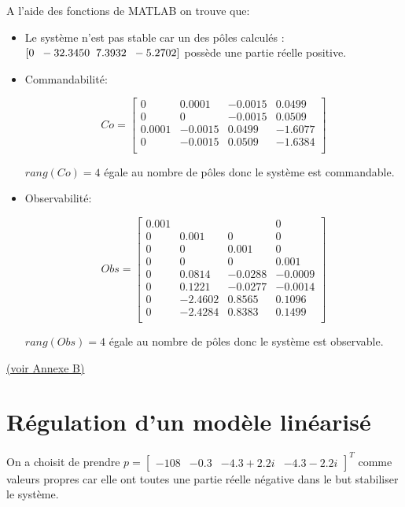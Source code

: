 \documentclass[12pt, a4paper, openany]{report}
\begin{document}
 A l'aide des fonctions de MATLAB on trouve que:\\
 	 \begin{itemize} [label=,font=\small \color{black}]
 	 \item Le système n'est pas stable car un des pôles calculés : $[0 \hspace{2mm} -32.3450 \hspace{2mm} 7.3932 \hspace{2mm} -5.2702 ]$  possède une partie réelle positive.
 	 \item 
 	  Commandabilité:
 	 \begin{center}
 \[
Co =
  \left[ {\begin{array}{cccc}
   0 & 0.0001 & -0.0015 & 0.0499 \\
    0 & 0 & -0.0015 & 0.0509 \\
     0.0001 & -0.0015 & 0.0499 & -1.6077 \\
      0 & -0.0015 & 0.0509 & -1.6384 \\
  \end{array} } \right]
\]
     \end{center}
     $rang(Co) = 4 $ égale au nombre de pôles donc le système est commandable.
     \item 
     Observabilité:
 	 \begin{center}
 \[
  Obs =
  \left[ {\begin{array}{cccc}
   0.001 &  &  & 0 \\
    0 & 0.001 & 0 & 0 \\
     0 & 0 & 0.001 & 0 \\
     0 & 0 & 0 & 0.001 \\
      0 & 0.0814 & -0.0288 & -0.0009 \\
      0 & 0.1221 & -0.0277 & -0.0014 \\
      0 & -2.4602 & 0.8565 & 0.1096 \\
      0 & -2.4284 & 0.8383 & 0.1499 \\     
  \end{array} } \right]
\]
     \end{center}
     $rang(Obs) = 4 $ égale au nombre de pôles donc le système est observable.
 	 \end{itemize}\hyperref[section1.11]{(voir Annexe B)}\label{annexe11}
  
 \chapter{Régulation d'un modèle linéarisé}
On a choisit de prendre $p=
  \begin{bmatrix}
  -108&-0.3&-4.3+2.2i&-4.3-2.2i
  \end{bmatrix}^{T}$ comme valeurs propres car elle ont toutes une partie réelle négative dans le but stabiliser le système.
    
\end{document}
